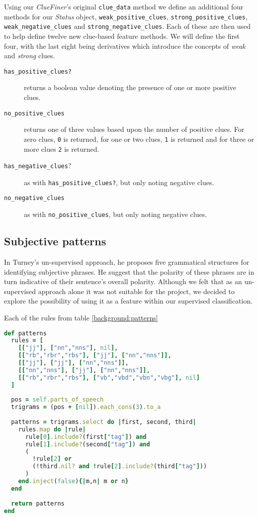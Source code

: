 Using our \emph{ClueFiner}'s original \texttt{clue\_data} method we define an additional four methods for our \emph{Status} object, \texttt{weak\-\_positive\-\_clues}, \texttt{strong\-\_positive\-\_clues}, \texttt{weak\-\_negative\-\_clues} and \texttt{strong\-\_negative\-\_clues}. Each of these are then used to help define twelve new clue-based feature methods. We will define the first four, with the last eight being derivatives which introduce the concepts of \emph{weak} and \emph{strong} clues.

\begin{description}
	\item [\texttt{has\_positive\_clues?}] returns a boolean value denoting the presence of one or more positive clues.
	\item [\texttt{no\_positive\_clues}] returns one of three values based upon the number of positive clues. For zero clues, \texttt{0} is returned, for one or two clues, \texttt{1} is returned and for three or more clues \texttt{2} is returned.
	\item [\texttt{has\_negative\_clues}?] as with \texttt{has\-\_positive\-\_clues?}, but only noting negative clues.
	\item [\texttt{no\_negative\_clues}] as with \texttt{no\-\_positive\-\_clues}, but only noting negative clues.
\end{description}

\subsection{Subjective patterns}

In Turney's \cite{Turney:2002vv} un-supervised approach, he proposes five grammatical structures for identifying subjective phrases. He suggest that the polarity of these phrases are in turn indicative of their sentence's overall polarity. Although we felt that as an un-supervised approach alone it was not suitable for the project, we decided to explore the possibility of using it as a feature within our supervised classification.

Each of the rules from table \ref{background:patterns}

\begin{lstlisting}[language=Ruby, caption={Unigram parsing for \emph{Example 1} using a small unigram set}, label=polarity:unigram_output]
def patterns
  rules = [
    [["jj"], ["nn","nns"], nil],
    [["rb","rbr","rbs"], ["jj"], ["nn","nns"]],
    [["jj"], ["jj"], ["nn","nns"]],
    [["nn","nns"], ["jj"], ["nn","nns"]],
    [["rb","rbr","rbs"], ["vb","vbd","vbn","vbg"], nil]
  ]
  
  pos = self.parts_of_speech
  trigrams = (pos + [nil]).each_cons(3).to_a    
  
  patterns = trigrams.select do |first, second, third|
    rules.map do |rule|
      rule[0].include?(first["tag"]) and 
      rule[1].include?(second["tag"]) and 
      (
        !rule[2] or 
        (!third.nil? and !rule[2].include?(third["tag"]))
      )
    end.inject(false){|m,n| m or n}
  end
  
  return patterns
end
\end{lstlisting}



